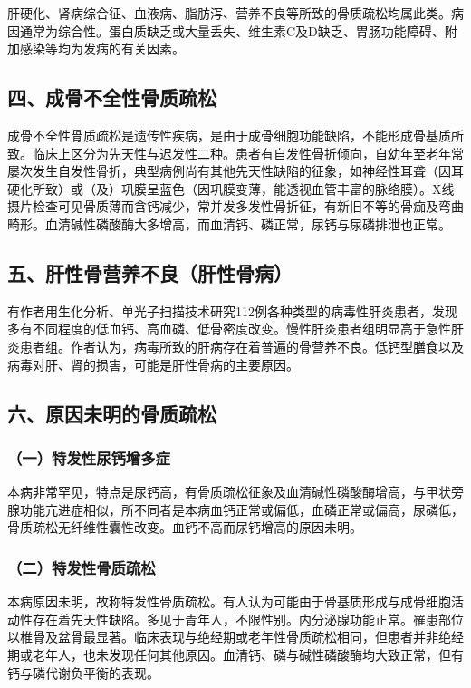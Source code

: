 肝硬化、肾病综合征、血液病、脂肪泻、营养不良等所致的骨质疏松均属此类。病因通常为综合性。蛋白质缺乏或大量丢失、维生素C及D缺乏、胃肠功能障碍、附加感染等均为发病的有关因素。

\subsection{四、成骨不全性骨质疏松}

成骨不全性骨质疏松是遗传性疾病，是由于成骨细胞功能缺陷，不能形成骨基质所致。临床上区分为先天性与迟发性二种。患者有自发性骨折倾向，自幼年至老年常屡次发生自发性骨折，典型病例尚有其他先天性缺陷的征象，如神经性耳聋（因耳硬化所致）或（及）巩膜呈蓝色（因巩膜变薄，能透视血管丰富的脉络膜）。X线摄片检查可见骨质薄而含钙减少，常并发多发性骨折征，有新旧不等的骨痂及弯曲畸形。血清碱性磷酸酶大多增高，而血清钙、磷正常，尿钙与尿磷排泄也正常。

\subsection{五、肝性骨营养不良（肝性骨病）}

有作者用生化分析、单光子扫描技术研究112例各种类型的病毒性肝炎患者，发现多有不同程度的低血钙、高血磷、低骨密度改变。慢性肝炎患者组明显高于急性肝炎患者组。作者认为，病毒所致的肝病存在着普遍的骨营养不良。低钙型膳食以及病毒对肝、肾的损害，可能是肝性骨病的主要原因。

\subsection{六、原因未明的骨质疏松}

\subsubsection{（一）特发性尿钙增多症}

本病非常罕见，特点是尿钙高，有骨质疏松征象及血清碱性磷酸酶增高，与甲状旁腺功能亢进症相似，所不同者是本病血钙正常或偏低，血磷正常或偏高，尿磷低，骨质疏松无纤维性囊性改变。血钙不高而尿钙增高的原因未明。

\subsubsection{（二）特发性骨质疏松}

本病原因未明，故称特发性骨质疏松。有人认为可能由于骨基质形成与成骨细胞活动性存在着先天性缺陷。多见于青年人，不限性别。内分泌腺功能正常。罹患部位以椎骨及盆骨最显著。临床表现与绝经期或老年性骨质疏松相同，但患者并非绝经期或老年人，也未发现任何其他原因。血清钙、磷与碱性磷酸酶均大致正常，但有钙与磷代谢负平衡的表现。

